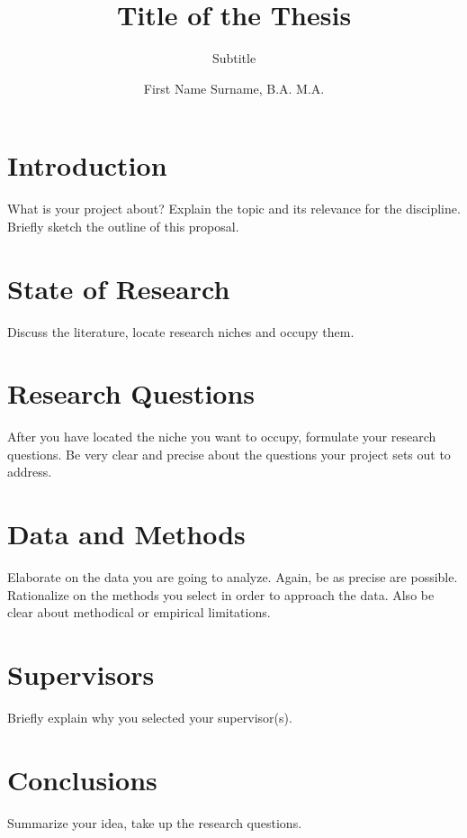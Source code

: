 \documentclass[naustrian,english]{univie-ling-expose}
\author{First Name Surname, B.A. M.A.}
\title{Title of the Thesis}
\subtitle{Subtitle}
\begin{document}
\maketitle

\tableofcontents

\section{Introduction}\label{sec:intro}

What is your project about? Explain the topic and its relevance for the discipline.
Briefly sketch the outline of this proposal.


\section{State of Research}\label{sec:state}

Discuss the literature, locate research niches and occupy them.


\section{Research Questions}\label{sec:questions}

After you have located the niche you want to occupy, formulate your research questions.
Be very clear and precise about the questions your project sets out to address.


\section{Data and Methods}\label{sec:data}

Elaborate on the data you are going to analyze. Again, be as precise are possible.
Rationalize on the methods you select in order to approach the data. Also be clear about methodical or empirical limitations.


\section{Supervisors}\label{sec:superv}

Briefly explain why you selected your supervisor(s).


\section{Conclusions}\label{sec:conclusions}

Summarize your idea, take up the research questions.
\end{document}
